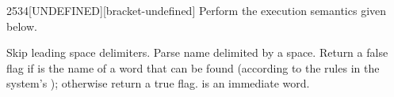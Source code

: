 \begin{worddef}{2534}{[UNDEFINED]}[bracket-undefined]%
\compile
	Perform the execution semantics given below.

\execute

	Skip leading space delimiters.  Parse name delimited by a space.
	Return a false flag if  is the name of a word that
	can be found (according to the rules in the system's );
	otherwise return a true flag. \word{[UNDEFINED]} is an immediate
	word.

	\begin{implement} %
		\word{:} \word{[UNDEFINED]}      \word{;} 
	\end{implement}
\end{worddef}
